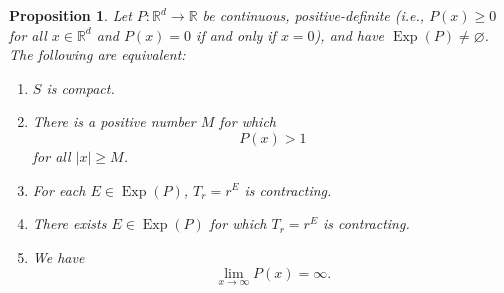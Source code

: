 \documentclass[11pt]{article}
\newtheorem{proposition}[theorem]{Proposition}
\theoremstyle{remark}
\newcommand\Exp{\operatorname{Exp}}
\begin{document}
\begin{proposition}\label{prop:PositiveHomogeneousCharacterization}
Let $P:\mathbb{R}^d\to\mathbb{R}$ be continuous, positive-definite (i.e., $P(x)\geq 0$ for all $x\in\mathbb{R}^d$ and $P(x)=0$ if and only if $x=0$), and have $\Exp(P)\neq \varnothing$. The following are equivalent:
\begin{enumerate}[label=(\alph*), ref=(\alph*)]
\item\label{cond:SisCompact} $S$ is compact.
\item\label{cond:PisAboveOne} There is a positive number $M$ for which
\begin{equation*}
P(x)>1
\end{equation*}
for all $|x|\geq M$. 
\item\label{cond:Contracting} For each $E\in\Exp(P)$, $T_r=r^E$ is contracting.
\item\label{cond:ThereExistsContracting} There exists $E\in\Exp(P)$ for which $T_r=r^E$ is contracting.
\item\label{cond:InfiniteLimit} We have
\begin{equation*}
\lim_{x\to\infty}P(x)=\infty.
\end{equation*}
\end{enumerate}
\end{proposition}
\end{document}
